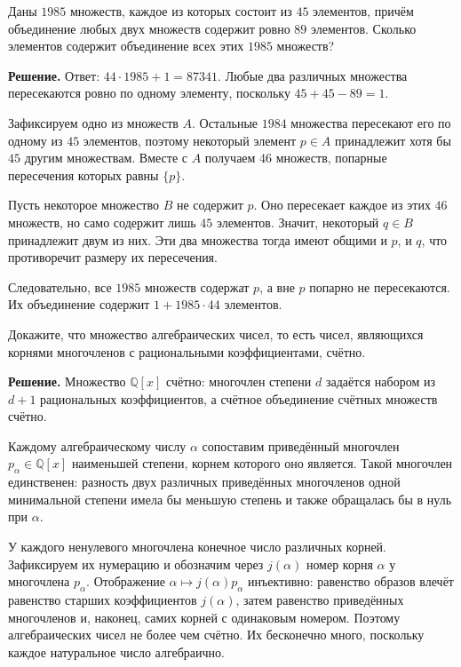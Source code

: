 \begin{problems}
\item Даны $1985$ множеств, каждое из которых состоит из $45$ элементов, причём объединение любых двух множеств содержит ровно $89$ элементов. Сколько элементов содержит объединение всех этих $1985$ множеств?
\par\smallskip\noindent\textbf{Решение.} Ответ: $44\cdot1985+1=87341$. Любые два различных множества пересекаются ровно по одному элементу, поскольку $45+45-89=1$.
\par Зафиксируем одно из множеств $A$. Остальные $1984$ множества пересекают его по одному из $45$ элементов, поэтому некоторый элемент $p\in A$ принадлежит хотя бы $45$ другим множествам. Вместе с $A$ получаем $46$ множеств, попарные пересечения которых равны $\{p\}$.
\par Пусть некоторое множество $B$ не содержит $p$. Оно пересекает каждое из этих $46$ множеств, но само содержит лишь $45$ элементов. Значит, некоторый $q\in B$ принадлежит двум из них. Эти два множества тогда имеют общими и $p$, и $q$, что противоречит размеру их пересечения.
\par Следовательно, все $1985$ множеств содержат $p$, а вне $p$ попарно не пересекаются. Их объединение содержит $1+1985\cdot44$ элементов.\par

\item Докажите, что множество алгебраических чисел, то есть чисел, являющихся корнями многочленов с рациональными коэффициентами, счётно.
\par\smallskip\noindent\textbf{Решение.} Множество $\mathbb Q[x]$ счётно: многочлен степени $d$ задаётся набором из $d+1$ рациональных коэффициентов, а счётное объединение счётных множеств счётно.
\par Каждому алгебраическому числу $\alpha$ сопоставим приведённый многочлен $p_\alpha\in\mathbb Q[x]$ наименьшей степени, корнем которого оно является. Такой многочлен единственен: разность двух различных приведённых многочленов одной минимальной степени имела бы меньшую степень и также обращалась бы в нуль при $\alpha$.
\par У каждого ненулевого многочлена конечное число различных корней. Зафиксируем их нумерацию и обозначим через $j(\alpha)$ номер корня $\alpha$ у многочлена $p_\alpha$. Отображение $\alpha\mapsto j(\alpha)p_\alpha$ инъективно: равенство образов влечёт равенство старших коэффициентов $j(\alpha)$, затем равенство приведённых многочленов и, наконец, самих корней с одинаковым номером. Поэтому алгебраических чисел не более чем счётно. Их бесконечно много, поскольку каждое натуральное число алгебраично.\par


\end{problems}
